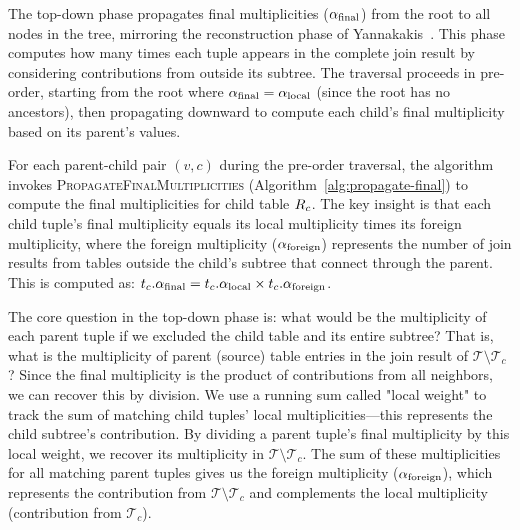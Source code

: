 The top-down phase propagates final multiplicities ($\alpha_{\text{final}}$) from the root to all nodes in the tree, mirroring the reconstruction phase of Yannakakis~\cite{yannakakis1981}. This phase computes how many times each tuple appears in the complete join result by considering contributions from outside its subtree. The traversal proceeds in pre-order, starting from the root where $\alpha_{\text{final}} = \alpha_{\text{local}}$ (since the root has no ancestors), then propagating downward to compute each child's final multiplicity based on its parent's values.

For each parent-child pair $(v, c)$ during the pre-order traversal, the algorithm invokes \textsc{PropagateFinalMultiplicities} (Algorithm~\ref{alg:propagate-final}) to compute the final multiplicities for child table $R_c$. The key insight is that each child tuple's final multiplicity equals its local multiplicity times its foreign multiplicity, where the foreign multiplicity ($\alpha_{\text{foreign}}$) represents the number of join results from tables outside the child's subtree that connect through the parent. This is computed as: $t_c.\alpha_{\text{final}} = t_c.\alpha_{\text{local}} \times t_c.\alpha_{\text{foreign}}$.

The core question in the top-down phase is: what would be the multiplicity of each parent tuple if we excluded the child table and its entire subtree? That is, what is the multiplicity of parent (source) table entries in the join result of $\mathcal{T} \setminus \mathcal{T}_c$? Since the final multiplicity is the product of contributions from all neighbors, we can recover this by division. We use a running sum called "local weight" to track the sum of matching child tuples' local multiplicities---this represents the child subtree's contribution. By dividing a parent tuple's final multiplicity by this local weight, we recover its multiplicity in $\mathcal{T} \setminus \mathcal{T}_c$. The sum of these multiplicities for all matching parent tuples gives us the foreign multiplicity ($\alpha_{\text{foreign}}$), which represents the contribution from $\mathcal{T} \setminus \mathcal{T}_c$ and complements the local multiplicity (contribution from $\mathcal{T}_c$).

